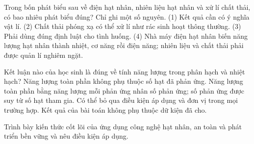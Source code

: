 \begin{ex}
Trong bốn phát biểu sau về điện hạt nhân, nhiên liệu hạt nhân và xử lí chất thải, có bao nhiêu phát biểu đúng? Chỉ ghi một số nguyên. (1) Kết quả cần có ý nghĩa vật lí. (2) Chất thải phóng xạ có thể xử lí như rác sinh hoạt thông thường. (3) Phải dùng đúng định luật cho tình huống. (4) Nhà máy điện hạt nhân biến năng lượng hạt nhân thành nhiệt, cơ năng rồi điện năng; nhiên liệu và chất thải phải được quản lí nghiêm ngặt.
\end{ex}

\begin{ex}
Kết luận nào của học sinh là đúng về tính năng lượng trong phân hạch và nhiệt hạch?
\choice
{Năng lượng toàn phần không phụ thuộc số hạt đã phản ứng.}
{\True Năng lượng toàn phần bằng năng lượng mỗi phản ứng nhân số phản ứng; số phản ứng được suy từ số hạt tham gia.}
{Có thể bỏ qua điều kiện áp dụng và đơn vị trong mọi trường hợp.}
{Kết quả của bài toán không phụ thuộc dữ kiện đã cho.}
\end{ex}

\begin{bt}
Trình bày kiến thức cốt lõi của ứng dụng công nghệ hạt nhân, an toàn và phát triển bền vững và nêu điều kiện áp dụng.
\end{bt}

